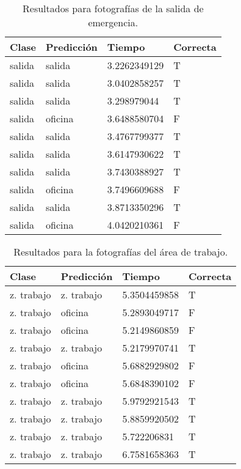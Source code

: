 \begin{table}[!h]
\centering
\begin{tabular}{|l|l|l|l|}
\hline
Clase & Predicción & Tiempo        & Correcta \\ \hline
salida  & salida       & 3.2262349129 & T     \\ \hline
salida  & salida       & 3.0402858257 & T     \\ \hline
salida  & salida     & 3.298979044  & T    \\ \hline
salida  & oficina     & 3.6488580704 & F    \\ \hline
salida  & salida       & 3.4767799377 & T     \\ \hline
salida  & salida       & 3.6147930622 & T     \\ \hline
salida  & salida       & 3.7430388927 & T     \\ \hline
salida  & oficina     & 3.7496609688 & F    \\ \hline
salida  & salida       & 3.8713350296 & T     \\ \hline
salida  & oficina     & 4.0420210361 & F    \\ \hline
\end{tabular}
\caption{Resultados para fotografías de la salida de emergencia.}
\label{table:exit}
\end{table}

\begin{table}[!h]
\centering
\begin{tabular}{|l|l|l|l|}
\hline
Clase      & Predicción & Tiempo        & Correcta \\ \hline
z. trabajo & z. trabajo & 5.3504459858 & T        \\ \hline
z. trabajo & oficina    & 5.2893049717 & F        \\ \hline
z. trabajo & oficina    & 5.2149860859 & F        \\ \hline
z. trabajo & z. trabajo & 5.2179970741 & T        \\ \hline
z. trabajo & oficina    & 5.6882929802 & F        \\ \hline
z. trabajo & oficina    & 5.6848390102 & F        \\ \hline
z. trabajo & z. trabajo & 5.9792921543 & T        \\ \hline
z. trabajo & z. trabajo & 5.8859920502 & T        \\ \hline
z. trabajo & z. trabajo & 5.722206831  & T        \\ \hline
z. trabajo & z. trabajo & 6.7581658363 & T        \\ \hline
\end{tabular}
\caption{Resultados para la fotografías del área
de trabajo.}
\label{table:desks}
\end{table}

